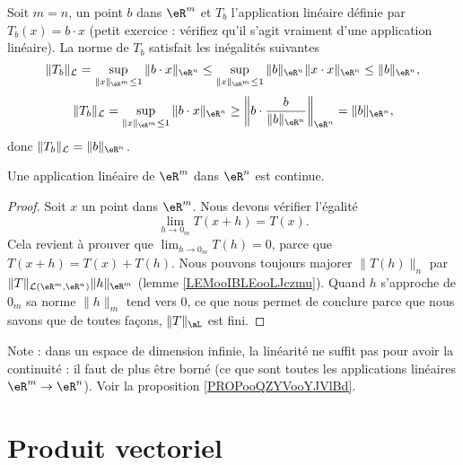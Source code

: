 
\begin{example}
  Soit $m=n$, un point $b$ dans $\eR^m$ et $T_b$ l'application linéaire définie par $T_b(x)=b\cdot x$ (petit exercice : vérifiez qu'il s'agit vraiment d'une application linéaire).  La norme de $T_b$ satisfait les inégalités suivantes 
 \[
\|T_b\|_{\mathcal{L}}=\sup_{\|x\|_{\eR^m}\leq 1}\|b\cdot x\|_{\eR^n}\leq \sup_{\|x\|_{\eR^m}\leq 1}\|b \|_{\eR^n}\|x\cdot x\|_{\eR^n}\leq\|b \|_{\eR^n},
\]
\[
\|T_b\|_{\mathcal{L}}=\sup_{\|x\|_{\eR^m}\leq 1}\|b\cdot x\|_{\eR^n}\geq \left\|b\cdot \frac{b}{\|b \|_{\eR^n}}\right\|_{\eR^n}=\|b \|_{\eR^n},
\]
donc $\|T_b\|_{\mathcal{L}}=\|b \|_{\eR^n}$.
\end{example}

\begin{proposition}
    Une application linéaire de \( \eR^m\) dans \( \eR^n\) est continue.
\end{proposition}

\begin{proof}
      Soit $x$ un point dans $\eR^m$. Nous devons vérifier l'égalité
      \begin{equation}
       \lim_{h\to 0_m}T(x+h)=T(x).
      \end{equation}
      Cela revient à prouver que $\lim_{h\to 0_m}T(h)=0$, parce que $T(x+h)=T(x)+T(h)$. Nous pouvons toujours majorer $\|T(h)\|_n$ par $\|T\|_{\mathcal{L}(\eR^m,\eR^n)}\| h \|_{\eR^m}$ (lemme \ref{LEMooIBLEooLJczmu}). Quand $h$ s'approche de $ 0_m $ sa norme $\|h\|_m$ tend vers $0$, ce que nous permet de conclure parce que nous savons que de toutes façons, $\| T \|_{\aL}$ est fini.
\end{proof}

Note : dans un espace de dimension infinie, la linéarité ne suffit pas pour avoir la continuité : il faut de plus être borné (ce que sont toutes les applications linéaires \( \eR^m\to\eR^n\)). Voir la proposition \ref{PROPooQZYVooYJVlBd}.

\section{Produit vectoriel}
\label{SECooIKGNooSrlXTL}

